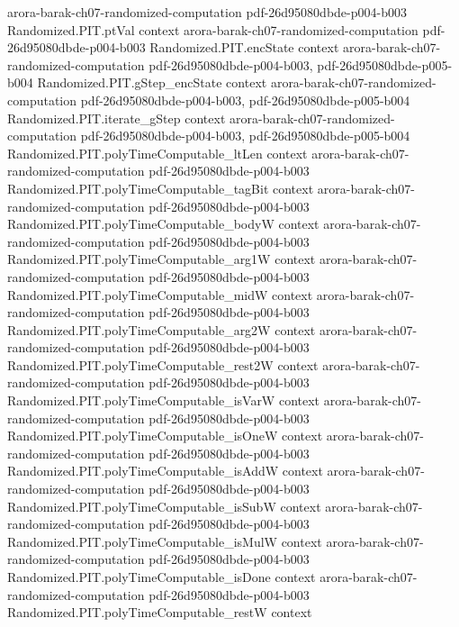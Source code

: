 \begin{theorem}
  {arora-barak-ch07-randomized-computation}
  {pdf-26d95080dbde-p004-b003}
\proofstep
  {Randomized.PIT.ptVal}
  {context}
  {arora-barak-ch07-randomized-computation}
  {pdf-26d95080dbde-p004-b003}
\proofstep
  {Randomized.PIT.encState}
  {context}
  {arora-barak-ch07-randomized-computation}
  {pdf-26d95080dbde-p004-b003,
    pdf-26d95080dbde-p005-b004}
\proofstep
  {Randomized.PIT.gStep_encState}
  {context}
  {arora-barak-ch07-randomized-computation}
  {pdf-26d95080dbde-p004-b003,
    pdf-26d95080dbde-p005-b004}
\proofstep
  {Randomized.PIT.iterate_gStep}
  {context}
  {arora-barak-ch07-randomized-computation}
  {pdf-26d95080dbde-p004-b003,
    pdf-26d95080dbde-p005-b004}
\proofstep
  {Randomized.PIT.polyTimeComputable_ltLen}
  {context}
  {arora-barak-ch07-randomized-computation}
  {pdf-26d95080dbde-p004-b003}
\proofstep
  {Randomized.PIT.polyTimeComputable_tagBit}
  {context}
  {arora-barak-ch07-randomized-computation}
  {pdf-26d95080dbde-p004-b003}
\proofstep
  {Randomized.PIT.polyTimeComputable_bodyW}
  {context}
  {arora-barak-ch07-randomized-computation}
  {pdf-26d95080dbde-p004-b003}
\proofstep
  {Randomized.PIT.polyTimeComputable_arg1W}
  {context}
  {arora-barak-ch07-randomized-computation}
  {pdf-26d95080dbde-p004-b003}
\proofstep
  {Randomized.PIT.polyTimeComputable_midW}
  {context}
  {arora-barak-ch07-randomized-computation}
  {pdf-26d95080dbde-p004-b003}
\proofstep
  {Randomized.PIT.polyTimeComputable_arg2W}
  {context}
  {arora-barak-ch07-randomized-computation}
  {pdf-26d95080dbde-p004-b003}
\proofstep
  {Randomized.PIT.polyTimeComputable_rest2W}
  {context}
  {arora-barak-ch07-randomized-computation}
  {pdf-26d95080dbde-p004-b003}
\proofstep
  {Randomized.PIT.polyTimeComputable_isVarW}
  {context}
  {arora-barak-ch07-randomized-computation}
  {pdf-26d95080dbde-p004-b003}
\proofstep
  {Randomized.PIT.polyTimeComputable_isOneW}
  {context}
  {arora-barak-ch07-randomized-computation}
  {pdf-26d95080dbde-p004-b003}
\proofstep
  {Randomized.PIT.polyTimeComputable_isAddW}
  {context}
  {arora-barak-ch07-randomized-computation}
  {pdf-26d95080dbde-p004-b003}
\proofstep
  {Randomized.PIT.polyTimeComputable_isSubW}
  {context}
  {arora-barak-ch07-randomized-computation}
  {pdf-26d95080dbde-p004-b003}
\proofstep
  {Randomized.PIT.polyTimeComputable_isMulW}
  {context}
  {arora-barak-ch07-randomized-computation}
  {pdf-26d95080dbde-p004-b003}
\proofstep
  {Randomized.PIT.polyTimeComputable_isDone}
  {context}
  {arora-barak-ch07-randomized-computation}
  {pdf-26d95080dbde-p004-b003}
\proofstep
  {Randomized.PIT.polyTimeComputable_restW}
  {context}

\end{theorem}
